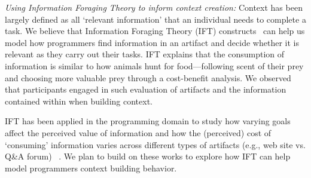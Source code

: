 \textit{Using Information Foraging Theory to inform context creation:}
Context has been largely defined as all `relevant information' that an individual needs to complete a task. We believe that Information Foraging Theory (IFT) constructs~\cite{Pirolli:1995,Fleming:2013} can help us model how programmers find information in an artifact and decide whether it is relevant as they carry out their tasks. IFT explains that the consumption of information is similar to how animals hunt for food---following scent of their prey and choosing more valuable prey through a cost-benefit analysis. We observed that participants engaged in such evaluation of artifacts and the information contained within when building context. 


IFT has been applied in the programming domain to study how varying goals~\cite{Piorkowski:2015} affect the perceived value of information and how the (perceived) cost of `consuming' information varies across different types of artifacts (e.g., web site vs. Q\&A forum) ~\cite{Jin:2017}. We plan to build on these works to explore how IFT can help model programmers context building behavior. 




